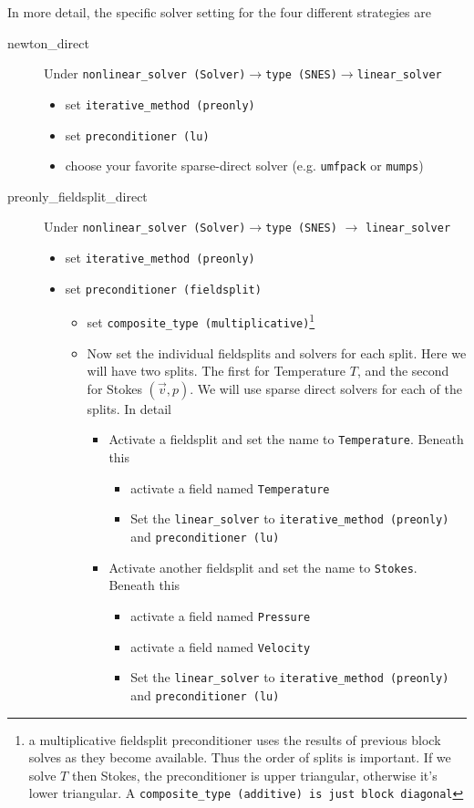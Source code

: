 In more detail, the specific solver setting for the four different
strategies are
\begin{description}
\item[newton\_direct] Under \texttt{nonlinear\_solver
    (Solver)}$\rightarrow$\texttt{type (SNES)}$\rightarrow$\texttt{linear\_solver}
  \begin{itemize}
  \item set \texttt{iterative\_method (preonly)}
  \item set \texttt{preconditioner (lu)} 
  \item choose your favorite
    sparse-direct solver (e.g. \texttt{umfpack} or \texttt{mumps})
  \end{itemize}
\item[preonly\_fieldsplit\_direct] Under \texttt{nonlinear\_solver
    (Solver)}$\rightarrow$\texttt{type (SNES)} $\rightarrow$ \texttt{linear\_solver}
  \begin{itemize}
  \item set \texttt{iterative\_method (preonly)}
  \item set \texttt{preconditioner (fieldsplit)}
    \begin{itemize}
    \item set \texttt{composite\_type (multiplicative)}\footnote{a
        multiplicative fieldsplit preconditioner uses the results of
        previous block solves as they become available.  Thus the
        order of splits is important.  If we solve $T$ then Stokes,
        the preconditioner is upper triangular, otherwise it's lower
        triangular.  A \texttt{composite\_type (additive) is just
          block diagonal}}
    \item Now set the individual fieldsplits and solvers for each
      split.  Here we will have two splits.  The first for Temperature
      $T$, and the second for Stokes $(\vec{v},p)$. We will use sparse
      direct solvers for each of the splits. In detail
      \begin{itemize}
      \item Activate a fieldsplit and set the name to
        \texttt{Temperature}.  Beneath this
        \begin{itemize}
      \item activate a field named
        \texttt{Temperature}
      \item Set the \texttt{linear\_solver} to
        \texttt{iterative\_method (preonly)}  and
        \texttt{preconditioner (lu)}
      \end{itemize}
      \item Activate another fieldsplit and set the name to
        \texttt{Stokes}. Beneath this
        \begin{itemize}
      \item activate a field named  \texttt{Pressure}
      \item activate a field named  \texttt{Velocity}
      \item Set the \texttt{linear\_solver} to
        \texttt{iterative\_method (preonly)}  and
        \texttt{preconditioner (lu)}
      \end{itemize}


\end{itemize}
\end{itemize}
\end{itemize}
\end{description}
